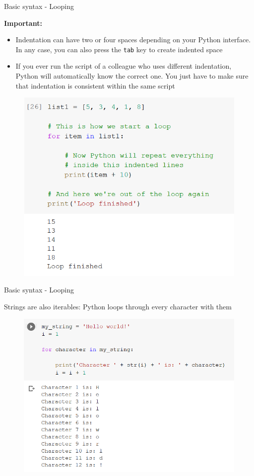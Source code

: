 \documentclass[aspectratio=169]{beamer}
\begin{document}
\begin{frame}{Basic syntax - Looping}

	\textbf{Important:}

	\begin{multicols}{2}
	
		\begin{itemize}
			\item Indentation can have two or four spaces depending on your Python interface. In any case, you can also press the \texttt{tab} key to create indented space
			\item If you ever run the script of a colleague who uses different indentation, Python will automatically know the correct one. You just have to make sure that indentation is consistent within the same script
		\end{itemize}
		\begin{figure}
			\centering
			\includegraphics[width=\linewidth]{img/list_loop.png}
		\end{figure}

	\end{multicols}

\end{frame}

\begin{frame}{Basic syntax - Looping}

	Strings are also iterables: Python loops through every character with them

	\begin{figure}
		\centering
		\includegraphics[width=0.55\linewidth]{img/string_loop.png}
	\end{figure}

\end{frame}
\end{document}

